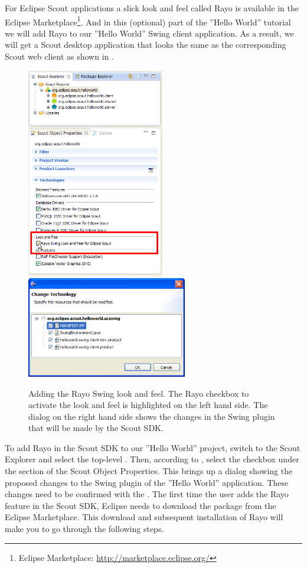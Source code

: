 \documentclass[a4paper,10pt,twoside]{book}
\begin{document}
For Eclipse Scout applications a slick look and feel called Rayo is available in the Eclipse Marketplace\footnote{
Eclipse Marketplace: \url{http://marketplace.eclipse.org/}
}.
And in this (optional) part of the ''Hello World'' tutorial we will add Rayo to our ''Hello World'' Swing client application.
As a result, we will get a Scout desktop application that looks the same as the corresponding Scout web client as shown in .

\begin{figure}
\includegraphics[width=6cm]{sdk_rayo_add_checkbox.png} \hspace{5mm}
\includegraphics[width=7cm]{sdk_rayo_confirm_changes.png}
\caption{Adding the Rayo Swing look and feel. The Rayo checkbox to activate the look and feel is highlighted on the left hand side. The dialog on the right hand side shows the changes in the Swing plugin that will be made by the Scout SDK.}
\end{figure}

To add Rayo in the Scout SDK to our ''Hello World'' project, switch to the Scout Explorer and select the top-level .
Then, according to , select the checkbox  under the  section of the Scout Object Properties.
This brings up a dialog showing the proposed changes to the Swing plugin of the ''Hello World'' application. 
These changes need to be confirmed with the .
The first time the user adds the Rayo feature in the Scout SDK, Eclipse needs to download the package from the Eclipse Marketplace.
This download and subsequent installation of Rayo will make you to go through the following steps.
\end{document}
